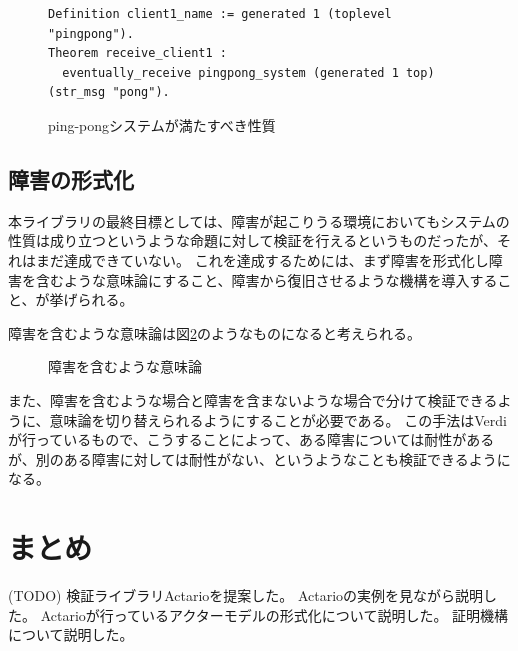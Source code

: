 \begin{figure}[tp]
  \begin{lstlisting}
Definition client1_name := generated 1 (toplevel "pingpong").
Theorem receive_client1 :
  eventually_receive pingpong_system (generated 1 top) (str_msg "pong").
  \end{lstlisting}
  \label{code:conclusion:pingpong-spec}
  \caption{ping-pongシステムが満たすべき性質}
\end{figure}

\subsection{障害の形式化}
本ライブラリの最終目標としては、障害が起こりうる環境においてもシステムの性質は成り立つというような命題に対して検証を行えるというものだったが、それはまだ達成できていない。
これを達成するためには、まず障害を形式化し障害を含むような意味論にすること、障害から復旧させるような機構を導入すること、が挙げられる。

障害を含むような意味論は図\ref{code:conclusion:failure}のようなものになると考えられる。

\begin{figure}
\label{code:conclusion:failure}
\caption{障害を含むような意味論}
\end{figure}

また、障害を含むような場合と障害を含まないような場合で分けて検証できるように、意味論を切り替えられるようにすることが必要である。
この手法はVerdiが行っているもので、こうすることによって、ある障害については耐性があるが、別のある障害に対しては耐性がない、というようなことも検証できるようになる。


\section{まとめ}

(TODO)
検証ライブラリActarioを提案した。
Actarioの実例を見ながら説明した。
Actarioが行っているアクターモデルの形式化について説明した。
証明機構について説明した。
